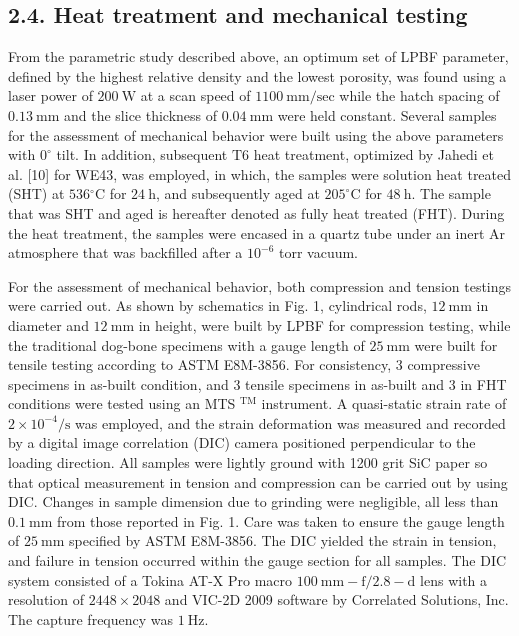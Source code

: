 \documentclass[10pt]{article}
\begin{document}
\subsection*{2.4. Heat treatment and mechanical testing}
From the parametric study described above, an optimum set of LPBF parameter, defined by the highest relative density and the lowest porosity, was found using a laser power of $200 \mathrm{~W}$ at a scan speed of $1100 \mathrm{~mm} / \mathrm{sec}$ while the hatch spacing of $0.13 \mathrm{~mm}$ and the slice thickness of $0.04 \mathrm{~mm}$ were held constant. Several samples for the assessment of mechanical behavior were built using the above parameters with $0^{\circ}$ tilt. In addition, subsequent $\mathrm{T} 6$ heat treatment, optimized by Jahedi et al. [10] for WE43, was employed, in which, the samples were solution heat treated (SHT) at $536{ }^{\circ} \mathrm{C}$ for $24 \mathrm{~h}$, and subsequently aged at $205^{\circ} \mathrm{C}$ for $48 \mathrm{~h}$. The sample that was SHT and aged is hereafter denoted as fully heat treated (FHT). During the heat treatment, the samples were encased in a quartz tube under an inert Ar atmosphere that was backfilled after a $10^{-6}$ torr vacuum.

For the assessment of mechanical behavior, both compression and tension testings were carried out. As shown by schematics in Fig. 1, cylindrical rods, $12 \mathrm{~mm}$ in diameter and $12 \mathrm{~mm}$ in height, were built by LPBF for compression testing, while the traditional dog-bone specimens with a gauge length of $25 \mathrm{~mm}$ were built for tensile testing according to ASTM E8M-3856. For consistency, 3 compressive specimens in as-built condition, and 3 tensile specimens in as-built and 3 in FHT conditions were tested using an MTS ${ }^{\mathrm{TM}}$ instrument. A quasi-static strain rate of $2 \times 10^{-4} / \mathrm{s}$ was employed, and the strain deformation was measured and recorded by a digital image correlation (DIC) camera positioned perpendicular to the loading direction. All samples were lightly ground with 1200 grit SiC paper so that optical measurement in tension and compression can be carried out by using DIC. Changes in sample dimension due to grinding were negligible, all less than $0.1 \mathrm{~mm}$ from those reported in Fig. 1. Care was taken to ensure the gauge length of $25 \mathrm{~mm}$ specified by ASTM E8M-3856. The DIC yielded the strain in tension, and failure in tension occurred within the gauge section for all samples. The DIC system consisted of a Tokina AT-X Pro macro $100 \mathrm{~mm}-\mathrm{f} / 2.8-\mathrm{d}$ lens with a resolution of $2448 \times 2048$ and VIC-2D 2009 software by Correlated Solutions, Inc. The capture frequency was $1 \mathrm{~Hz}$.
\end{document}
